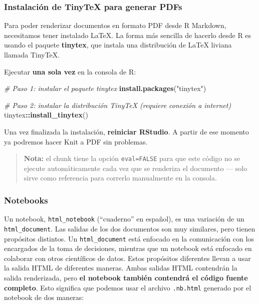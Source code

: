 \documentclass[
]{article}
\newenvironment{Shaded}{\begin{snugshade}}{\end{snugshade}}
\newcommand{\CommentTok}[1]{\textcolor[rgb]{0.56,0.35,0.01}{\textit{#1}}}
\newcommand{\FunctionTok}[1]{\textcolor[rgb]{0.13,0.29,0.53}{\textbf{#1}}}
\newcommand{\NormalTok}[1]{#1}
\newcommand{\SpecialCharTok}[1]{\textcolor[rgb]{0.81,0.36,0.00}{\textbf{#1}}}
\newcommand{\StringTok}[1]{\textcolor[rgb]{0.31,0.60,0.02}{#1}}
\begin{document}
\subsubsection{Instalación de TinyTeX para generar
PDFs}\label{instalaciuxf3n-de-tinytex-para-generar-pdfs}

Para poder renderizar documentos en formato PDF desde R Markdown,
necesitamos tener instalado LaTeX. La forma más sencilla de hacerlo
desde R es usando el paquete \textbf{tinytex}, que instala una
distribución de LaTeX liviana llamada TinyTeX.

Ejecutar \textbf{una sola vez} en la consola de R:

\begin{Shaded}
\begin{Highlighting}[]
\CommentTok{\# Paso 1: instalar el paquete tinytex}
\FunctionTok{install.packages}\NormalTok{(}\StringTok{"tinytex"}\NormalTok{)}

\CommentTok{\# Paso 2: instalar la distribución TinyTeX (requiere conexión a internet)}
\NormalTok{tinytex}\SpecialCharTok{::}\FunctionTok{install\_tinytex}\NormalTok{()}
\end{Highlighting}
\end{Shaded}

Una vez finalizada la instalación, \textbf{reiniciar RStudio}. A partir
de ese momento ya podremos hacer Knit a PDF sin problemas.

\begin{quote}
\textbf{Nota:} el chunk tiene la opción \texttt{eval=FALSE} para que
este código no se ejecute automáticamente cada vez que se renderiza el
documento --- solo sirve como referencia para correrlo manualmente en la
consola.
\end{quote}

\subsubsection{Notebooks}\label{notebooks}

Un notebook, \texttt{html\_notebook} (``cuaderno'' en español), es una
variación de un \texttt{html\_document}. Las salidas de los dos
documentos son muy similares, pero tienen propósitos distintos. Un
\texttt{html\_document} está enfocado en la comunicación con los
encargados de la toma de decisiones, mientras que un notebook está
enfocado en colaborar con otros científicos de datos. Estos propósitos
diferentes llevan a usar la salida HTML de diferentes maneras. Ambas
salidas HTML contendrán la salida renderizada, pero \textbf{el notebook
también contendrá el código fuente completo}. Esto significa que podemos
usar el archivo \texttt{.nb.html} generado por el notebook de dos
maneras:
\end{document}
